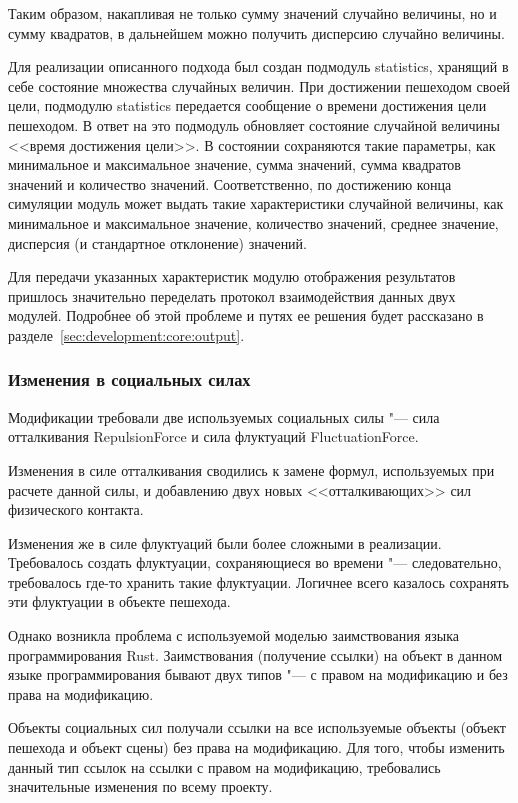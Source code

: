 Таким образом, накапливая не только сумму значений случайно величины, но и сумму квадратов, в дальнейшем можно получить дисперсию случайно величины.

Для реализации описанного подхода был создан подмодуль sta\-ti\-stics, хранящий в себе состояние множества случайных величин.
При достижении пешеходом своей цели, подмодулю sta\-ti\-stics передается сообщение о времени достижения цели пешеходом.
В ответ на это подмодуль обновляет состояние случайной величины <<время достижения цели>>.
В состоянии сохраняются такие параметры, как минимальное и максимальное значение, сумма значений, сумма квадратов значений и количество значений.
Соответственно, по достижению конца симуляции модуль может выдать такие характеристики случайной величины, как
минимальное и максимальное значение, количество значений, среднее значение, дисперсия (и стандартное отклонение) значений.

Для передачи указанных характеристик модулю отображения результатов пришлось значительно переделать протокол взаимодействия данных двух модулей.
Подробнее об этой проблеме и путях ее решения будет рассказано в разделе~\ref{sec:development:core:output}.

\subsubsection{Изменения в социальных силах}
\label{sec:development:core:forces}

Модификации требовали две используемых социальных силы "--- сила отталкивания Re\-pul\-si\-on\-For\-ce и
сила флуктуаций Fluc\-tu\-a\-ti\-on\-For\-ce.

Изменения в силе отталкивания сводились к замене формул, используемых при расчете данной силы,
и добавлению двух новых <<отталкивающих>> сил физического контакта.

Изменения же в силе флуктуаций были более сложными в реализации.
Требовалось создать флуктуации, сохраняющиеся во времени "--- следовательно, требовалось где-то хранить такие флуктуации.
Логичнее всего казалось сохранять эти флуктуации в объекте пешехода.

Однако возникла проблема с используемой моделью заимствования языка программирования Rust.
Заимствования (получение ссылки) на объект в данном языке программирования бывают двух типов "---
с правом на модификацию и без права на модификацию.

Объекты социальных сил получали ссылки на все используемые объекты (объект пешехода и объект сцены)
без права на модификацию. Для того, чтобы изменить данный тип ссылок на ссылки с правом на модификацию,
требовались значительные изменения по всему проекту.

